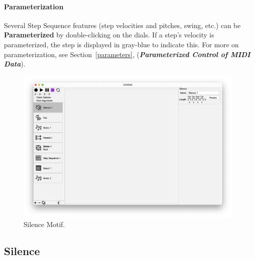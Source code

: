 \documentclass[twoside,10pt]{article}
\newcommand\ignore[1]{}
\begin{document}
\ignore{
\paragraph{Recording a Step Sequence}

If you arm one or more Tracks, set their Notes, and set the Sequence's MIDI Input accordingly, then you can record in Notes to those tracks when you press Record on Seq.   You will find this easier if you turn on the metronome and if you set the Step Sequence to be the Root, so it records immediately.  Remember that if your Step Sequence motif is not a descendant of the Root, it will never be reached to do Recording.
}

\paragraph{Parameterization}

Several Step Sequence features (step velocities and pitches, swing, etc.) can be {\bf Parameterized} by double-clicking on the dials.  If a step's velocity is parameterized, the step is displayed in gray-blue to indicate this.  For more on parameterization, see Section~\ref{parameters}, (\textbf{\textit{Parameterized Control of MIDI Data}}).


\clearpage


\begin{figure}[t]
\centering
\includegraphics[width=6.5in]{Silence}
\vspace{-2em}
\caption{Silence Motif.}
\label{silence}
\end{figure}

\subsection{Silence}
\end{document}
